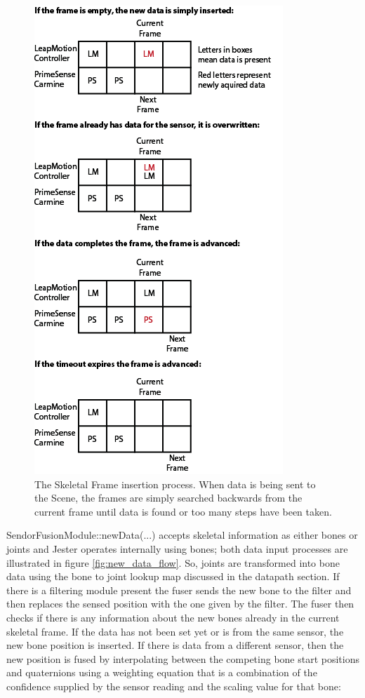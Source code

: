 \begin{figure}[]
\centering
\includegraphics[width=.7\textwidth]{figures/frameFull}
\caption{The Skeletal Frame insertion process. When data is being sent to the Scene, the frames are simply searched backwards from the current frame until data is found or too many steps have been taken.}
\label{fig:skeleton_frames}
\end{figure}

SendorFusionModule::newData(...) accepts skeletal information as either bones or joints and Jester operates internally using bones; both data input processes are illustrated in figure \ref{fig:new_data_flow}. So, joints are transformed into bone data using the bone to joint lookup map discussed in the datapath section. If there is a filtering module present the fuser sends the new bone to the filter and then replaces the sensed position with the one given by the filter. The fuser then checks if there is any information about the new bones already in the current skeletal frame. If the data has not been set yet or is from the same sensor, the new bone position is inserted. If there is data from a different sensor, then the new position is fused by interpolating between the competing bone start positions and quaternions using a weighting equation that is a combination of the confidence supplied by the sensor reading and the scaling value for that bone:

